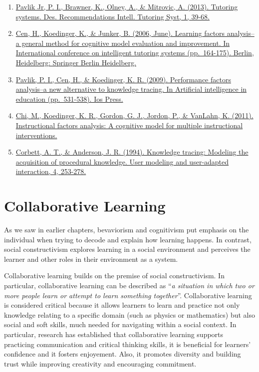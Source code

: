 \documentclass[
]{book}
\providecommand{\tightlist}{%
  \setlength{\itemsep}{0pt}\setlength{\parskip}{0pt}}
\begin{document}
\begin{enumerate}
\def\labelenumi{\arabic{enumi}.}
\tightlist
\item
  \href{https://citeseerx.ist.psu.edu/document?repid=rep1&type=pdf&doi=040d21fb726c5175eca9e37801031519f06e0d86\#page=63}{Pavlik Jr, P. I., Brawner, K., Olney, A., \& Mitrovic, A. (2013). Tutoring systems. Des. Recommendations Intell. Tutoring Syst, 1, 39-68.}
\item
  \href{http://pact.cs.cmu.edu/pubs/Cen\%2C\%20Koedinger\%20\%26\%20Junker06.pdf}{Cen, H., Koedinger, K., \& Junker, B. (2006, June). Learning factors analysis--a general method for cognitive model evaluation and improvement. In International conference on intelligent tutoring systems (pp.~164-175). Berlin, Heidelberg: Springer Berlin Heidelberg.}
\item
  \href{http://pact.cs.cmu.edu/pubs/AIED\%202009\%20final\%20Pavlik\%20Cen\%20Keodinger\%20corrected.pdf}{Pavlik, P. I., Cen, H., \& Koedinger, K. R. (2009). Performance factors analysis--a new alternative to knowledge tracing. In Artificial intelligence in education (pp.~531-538). Ios Press.}
\item
  \href{http://pact.cs.cmu.edu/pubs/Chi,\%20Koedinger\%20Gordon,\%20Jordon\%20&\%20VanLehn\%20-\%20edm2011.pdf}{Chi, M., Koedinger, K. R., Gordon, G. J., Jordon, P., \& VanLahn, K. (2011). Instructional factors analysis: A cognitive model for multiple instructional interventions.}
\item
  \href{http://act-r.psy.cmu.edu/wordpress/wp-content/uploads/2012/12/893CorbettAnderson1995.pdf}{Corbett, A. T., \& Anderson, J. R. (1994). Knowledge tracing: Modeling the acquisition of procedural knowledge. User modeling and user-adapted interaction, 4, 253-278.}
\end{enumerate}

\chapter{Collaborative Learning}\label{cits}

As we saw in earlier chapters, bevaviorism and cognitivism put emphasis on the individual when trying to decode and explain how learning happens. In contrast, social constructivism explores learning in a social environment and perceives the learner and other roles in their environment as a system.

Collaborative learning builds on the premise of social constructivism. In particular, collaborative learning can be described as ``\emph{a situation in which two or more people learn or attempt to learn something together}''\citep{dillenbourg1999you}. Collaborative learning is considered critical because it allows learners to learn and practice not only knowledge relating to a specific domain (such as physics or mathematics) but also social and soft skills, much needed for navigating within a social context. In particular, research has established that collaborative learning supports practicing communication and critical thinking skills, it is beneficial for learners' confidence and it fosters enjoyement. Also, it promotes diversity and building trust while improving creativity and encouraging commitment.
\end{document}
